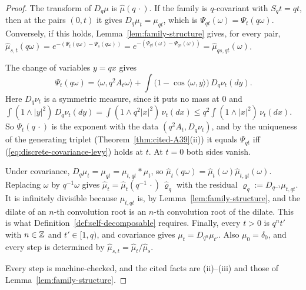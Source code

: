 \begin{proof}
\leanok
{}
The transform of $D_q\mu$ is $\widehat\mu(q\,\cdot)$. If the family is $q$-covariant with
$S_qt = qt$, then at the pairs $(0, t)$ it gives $D_q\mu_t = \mu_{qt}$, which is
$\Psi_{qt}(\omega) = \Psi_t(q\omega)$. Conversely, if this holds, Lemma~\ref{lem:family-structure}
gives, for every pair,
$\widehat\mu_{s,t}(q\omega) = e^{-(\Psi_t(q\omega) - \Psi_s(q\omega))} =
e^{-(\Psi_{qt}(\omega) - \Psi_{qs}(\omega))} = \widehat\mu_{qs,qt}(\omega)$.

The change of variables $y = qx$ gives
\[
  \Psi_t(q\omega) = \langle\omega, q^2A_t\omega\rangle + \int\bigl(1 - \cos\langle\omega, y\rangle\bigr)\,D_q\nu_t(dy).
\]
Here $D_q\nu_t$ is a symmetric \Levy{} measure, since it puts no mass at $0$ and
$\int(1 \wedge |y|^2)\,D_q\nu_t(dy) = \int(1 \wedge q^2|x|^2)\,\nu_t(dx) \le q^2\int(1 \wedge |x|^2)\,\nu_t(dx)$.
So $\Psi_t(q\,\cdot)$ is the exponent with the data $(q^2A_t, D_q\nu_t)$, and by the uniqueness of the
generating triplet (Theorem~\ref{thm:cited-A39}(ii)) it equals $\Psi_{qt}$ iff
(\ref{eq:discrete-covariance-levy}) holds at $t$. At $t = 0$ both sides vanish.

Under covariance, $D_q\mu_t = \mu_{qt} = \mu_{t,qt} * \mu_t$, so
$\widehat\mu_t(q\omega) = \widehat\mu_t(\omega)\widehat\mu_{t,qt}(\omega)$. Replacing $\omega$ by
$q^{-1}\omega$ gives $\widehat\mu_t = \widehat\mu_t(q^{-1}\,\cdot)\,\widehat\varrho_q$ with the residual
$\varrho_q := D_{q^{-1}}\mu_{t,qt}$. It is infinitely divisible because $\mu_{t,qt}$ is, by
Lemma~\ref{lem:family-structure}, and the dilate of an $n$-th convolution root is an $n$-th
convolution root of the dilate. This is what Definition~\ref{def:self-decomposable} requires.
Finally, every $t > 0$ is $q^nt'$ with $n \in \mathbb{Z}$ and $t' \in [1, q)$, and covariance gives
$\mu_t = D_{q^n}\mu_{t'}$. Also $\mu_0 = \delta_0$, and every step is determined by
$\widehat\mu_{s,t} = \widehat\mu_t/\widehat\mu_s$.

Every step is machine-checked, and the cited facts are (ii)--(iii) and those of
Lemma~\ref{lem:family-structure}.
\end{proof}

